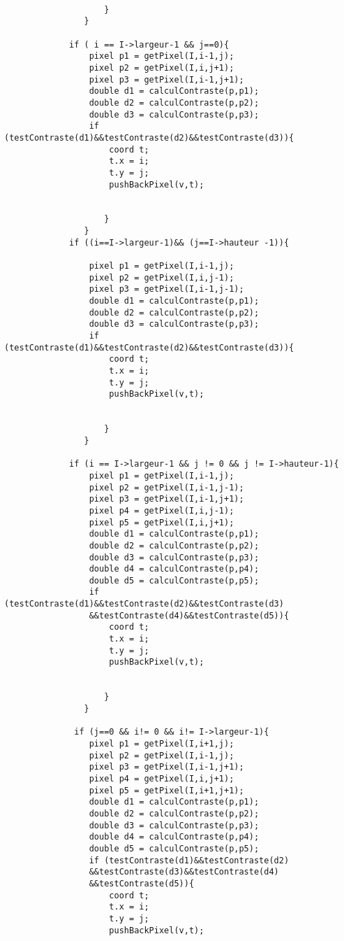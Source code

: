 \documentclass[a4paper , 10pt]{article}
\begin{document}
\begin{verbatim}
	                   
        	        }
                }

             if ( i == I->largeur-1 && j==0){
        	     pixel p1 = getPixel(I,i-1,j);
        	     pixel p2 = getPixel(I,i,j+1);
        	     pixel p3 = getPixel(I,i-1,j+1);
        	     double d1 = calculContraste(p,p1);
	             double d2 = calculContraste(p,p2);
	             double d3 = calculContraste(p,p3);
        	     if (testContraste(d1)&&testContraste(d2)&&testContraste(d3)){
        		     coord t;
                     t.x = i;
	                 t.y = j;
	                 pushBackPixel(v,t);
	                 
	                  
	                }
                }
             if ((i==I->largeur-1)&& (j==I->hauteur -1)){

                 pixel p1 = getPixel(I,i-1,j);
        	     pixel p2 = getPixel(I,i,j-1);
        	     pixel p3 = getPixel(I,i-1,j-1);
        	     double d1 = calculContraste(p,p1);
	             double d2 = calculContraste(p,p2);
	             double d3 = calculContraste(p,p3);
        	     if (testContraste(d1)&&testContraste(d2)&&testContraste(d3)){
        		     coord t;
                     t.x = i;
	                 t.y = j;
	                 pushBackPixel(v,t);
	                 
	                  
        	        }
                }

             if (i == I->largeur-1 && j != 0 && j != I->hauteur-1){
                 pixel p1 = getPixel(I,i-1,j);
        	     pixel p2 = getPixel(I,i-1,j-1);
               	 pixel p3 = getPixel(I,i-1,j+1);
        	     pixel p4 = getPixel(I,i,j-1);
        	     pixel p5 = getPixel(I,i,j+1);
                 double d1 = calculContraste(p,p1);
	             double d2 = calculContraste(p,p2);
	             double d3 = calculContraste(p,p3);
	             double d4 = calculContraste(p,p4);
	             double d5 = calculContraste(p,p5);
                 if (testContraste(d1)&&testContraste(d2)&&testContraste(d3)
                 &&testContraste(d4)&&testContraste(d5)){
        		     coord t;
                     t.x = i;
	                 t.y = j;
	                 pushBackPixel(v,t);
	                 
	                  
        	        }
                }

              if (j==0 && i!= 0 && i!= I->largeur-1){
        	     pixel p1 = getPixel(I,i+1,j);
        	     pixel p2 = getPixel(I,i-1,j);
        	     pixel p3 = getPixel(I,i-1,j+1);
        	     pixel p4 = getPixel(I,i,j+1);
        	     pixel p5 = getPixel(I,i+1,j+1);
        	     double d1 = calculContraste(p,p1);
	             double d2 = calculContraste(p,p2);
	             double d3 = calculContraste(p,p3);
	             double d4 = calculContraste(p,p4);
	             double d5 = calculContraste(p,p5);
                 if (testContraste(d1)&&testContraste(d2)
                 &&testContraste(d3)&&testContraste(d4)
                 &&testContraste(d5)){
        		     coord t;
                     t.x = i;
	                 t.y = j;
	                 pushBackPixel(v,t);
	                 

\end{verbatim}
\end{document}
